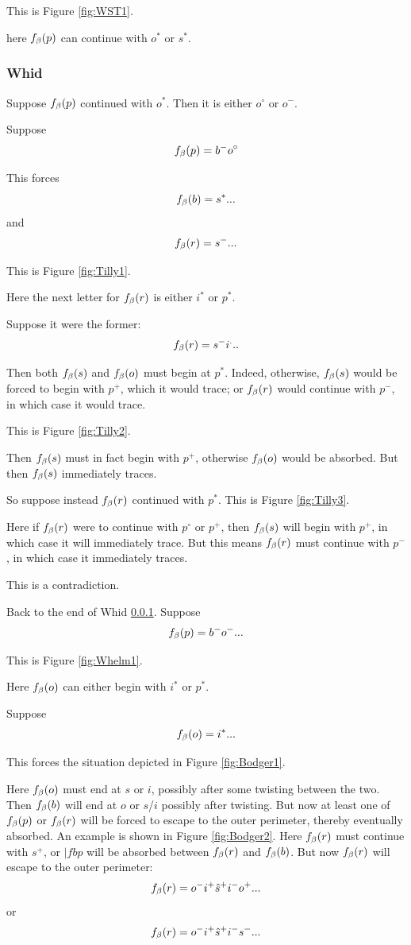 This is Figure \ref{fig:WST1}.

here $f_\beta(p)$ can continue with $o^*$ or $s^*$.

\subsubsection{Whid}\label{Whid}
Suppose $f_\beta(p)$ continued with $o^*$. Then it is either $o^\circ$ or $o^-$.

Suppose 
$$f_\beta(p) = b^- o^\circ$$

This forces 
$$f_\beta(b) = s^*...$$
and
$$f_\beta(r) = s^-...$$

This is Figure \ref{fig:Tilly1}.

Here the next letter for $f_\beta(r)$ is either $i^*$ or $p^*$.

Suppose it were the former:
$$f_\beta(r) = s^- i^...$$

Then both $f_\beta(s)$ and $f_\beta(o)$ must begin at $p^*$. Indeed, otherwise, $f_\beta(s)$ would be forced to begin with $p^+$, which it would trace; or $f_\beta(r)$ would continue with $p^-$, in which case it would trace. 

This is Figure \ref{fig:Tilly2}.

Then $f_\beta(s)$ must in fact begin with $p^+$, otherwise $f_\beta(o)$ would be absorbed. But then $f_\beta(s)$ immediately traces.

So suppose instead $f_\beta(r)$ continued with $p^*$. This is Figure \ref{fig:Tilly3}.

Here if $f_\beta(r)$ were to continue with $p^\circ$ or $p^+$, then $f_\beta(s)$ will begin with $p^+$, in which case it will immediately trace. But this means $f_\beta(r)$ must continue with $p^-$, in which case it immediately traces.

This is a contradiction.


\label{Whelm}
Back to the end of Whid \ref{Whid}. Suppose
$$f_\beta(p) = b^- o^-...$$

This is Figure \ref{fig:Whelm1}.

Here $f_\beta(o)$ can either begin with $i^*$ or $p^*$.

Suppose
$$f_\beta(o) = i^*...$$

This forces the situation depicted in Figure \ref{fig:Bodger1}.

Here $f_\beta(o)$ must end at $s$ or $i$, possibly after some twisting between the two. Then $f_\beta(b)$ will end at $o$ or $s$/$i$ possibly after twisting. But now at least one of $f_\beta(p)$ or $f_\beta(r)$ will be forced to escape to the outer perimeter, thereby eventually absorbed. An example is shown in Figure \ref{fig:Bodger2}. Here $f_\beta(r)$ must continue with $s^+$, or $|fbp$ will be absorbed between $f_\beta(r)$ and $f_\beta(b)$. But now $f_\beta(r)$ will escape to the outer perimeter:
$$f_\beta(r) = o^- i^+ \hat{s}^+ i^- o^+...$$
or
$$f_\beta(r) = o^- i^+ \hat{s}^+ i^- s^-...$$

